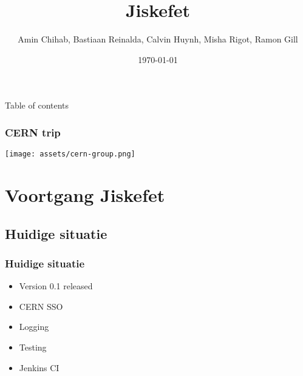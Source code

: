 \documentclass[12pt]{beamer}
\title{Jiskefet}
\author{Amin Chihab, Bastiaan Reinalda, Calvin Huynh, Misha Rigot, Ramon Gill}
\date{\today}
\begin{document}
	\begin{frame}
	\titlepage
	\end{frame}

	\begin{frame}{Table of contents}
		\tableofcontents
    \end{frame}
    
    \begin{frame}
        \frametitle{CERN trip}
   		\texttt{[image: assets/cern-group.png]}
    \end{frame}

    \section{Voortgang Jiskefet}
    \subsection{Huidige situatie}
    \begin{frame}
        \frametitle{Huidige situatie}
        \begin{itemize}
            \item Version 0.1 released
            \item CERN SSO
            \item Logging
            \item Testing
            \item Jenkins CI
        \end{itemize}
    \end{frame}
\end{document}
